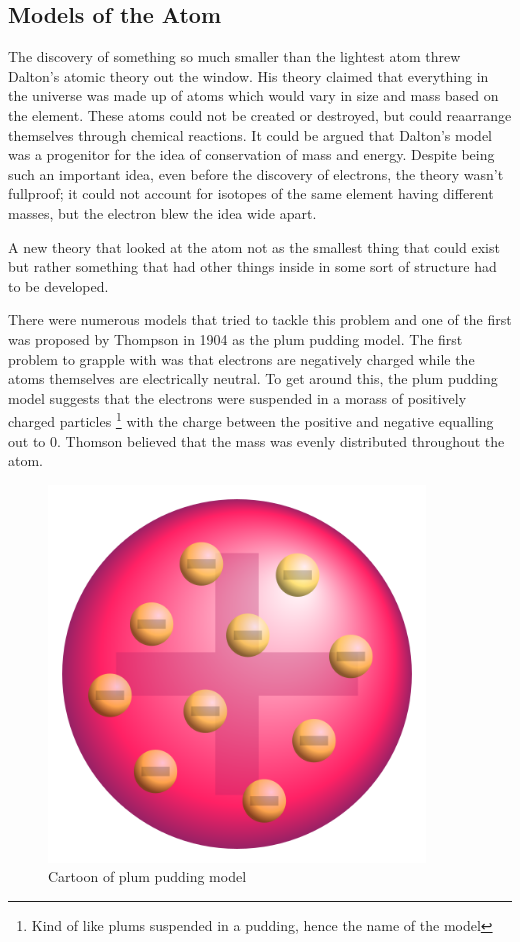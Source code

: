 \subsection{Models of the Atom}

The discovery of something so much smaller than the lightest atom threw Dalton's atomic theory out the window.
His theory claimed that  everything in the universe was made up of atoms which would vary in size and mass based on the element.
These atoms could not be created or destroyed, but  could reaarrange themselves through chemical reactions.
It could be argued that Dalton's model was a progenitor for the idea of conservation of mass and energy.
Despite being such an important idea, even before the discovery of electrons, the theory wasn't fullproof; it could not account for isotopes of the same element having different masses, but the electron blew the idea wide apart.

A new theory that looked at the atom not as the smallest thing that could exist but rather something that had other things inside in some sort of structure had to be developed.

There were numerous models that tried to tackle this problem and one of the first was proposed by Thompson in 1904 as the plum pudding model.
The first problem to grapple with was that electrons are negatively charged while the atoms themselves are electrically neutral.
To get around this, the plum pudding model suggests that  the electrons were suspended in a morass of positively charged particles
\footnote{Kind of like plums suspended in a pudding, hence the name of the model}
with the charge between the positive  and negative equalling out to 0.
Thomson believed that the mass was evenly distributed throughout the atom.

\begin{figure}[H]
  \centering
  \includegraphics[width=100mm]{figures/plumPudding.png}
  \caption{Cartoon of plum pudding model}
  \label{plumPudding}
\end{figure}

